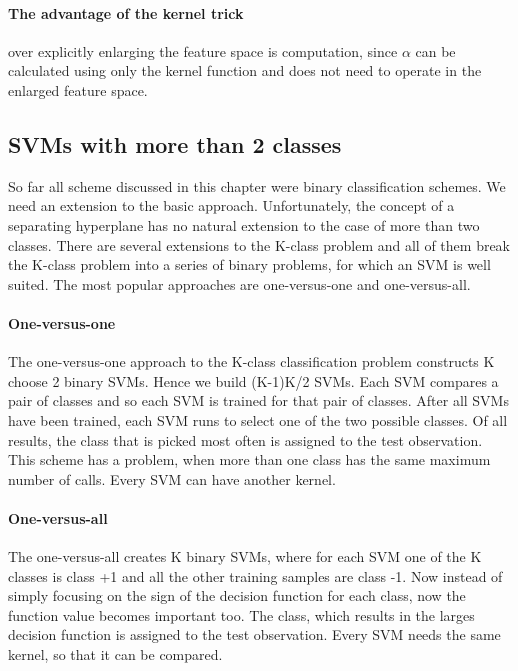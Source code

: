 \documentclass[../document.tex]{subfiles}
\begin{document}
	\paragraph{The advantage of the kernel trick} over explicitly enlarging the feature space is computation, since $\alpha$ can be calculated using only the kernel function and does not need to operate in the enlarged feature space.

	\subsection{SVMs with more than 2 classes}
	So far all scheme discussed in this chapter were binary classification schemes. We need an extension to the basic approach. Unfortunately, the concept of a separating hyperplane has no natural extension to the case of more than two classes. There are several extensions to the K-class problem and all of them break the K-class problem into a series of binary problems, for which an SVM is well suited. The most popular approaches are one-versus-one and one-versus-all.

	\paragraph{One-versus-one}
	The one-versus-one approach to the K-class classification problem constructs K choose 2 binary SVMs. Hence we build (K-1)K/2 SVMs. Each SVM compares a pair of classes and so each SVM is trained for that pair of classes. After all SVMs have been trained, each SVM runs to select one of the two possible classes. Of all results, the class that is picked most often is assigned to the test observation. This scheme has a problem, when more than one class has the same maximum number of calls. Every SVM can have another kernel.

	\paragraph{One-versus-all}
	The one-versus-all creates K binary SVMs, where for each SVM one of the K classes is class +1 and all the other training samples are class -1. Now instead of simply focusing on the sign of the decision function for each class, now the function value becomes important too. The class, which results in the larges decision function is assigned to the test observation. Every SVM needs the same kernel, so that it can be compared.
\end{document}

